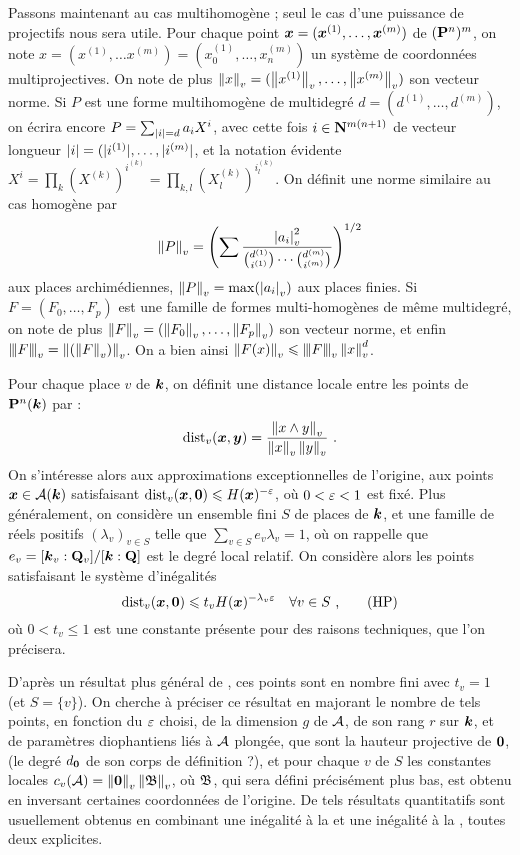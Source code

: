 Passons maintenant au cas multihomogène ; seul le cas d'une puissance de
projectifs nous sera utile. Pour chaque point ${\boldsymbol{x}} = ({\boldsymbol{x}}^{(1)}, \dots,
{\boldsymbol{x}}^{(m)})$ de $(\mathbf{P}^n)^m$, on note $x = (x^{(1)}, \dots x^{(m)}) =
(x_0^{(1)}, \dots, x_n^{(m)})$ un système de coordonnées multiprojectives. On
note de plus $\left\lVert x\right\rVert_{v} = (\left\lVert x^{(1)}\right\rVert_{v},\dots, \left\lVert x^{(m)}\right\rVert_{v})$ son vecteur norme.
Si $P$ est une forme multihomogène de multidegré $d= (d^{(1)}, \dots,
d^{(m)})$, on écrira encore $P = \sum_{{|i|}=d} a_i X^i$, avec cette fois $i
\in \mathbf{N}^{m(n+1)}$ de vecteur longueur ${|i|} = (|i^{(1)}|, \dots, |i^{(m)}|$,
et la notation évidente $X^i = \prod_{k} (X^{(k)})^{i^{(k)}} = \prod_{k, l}
(X_l^{(k)})^{i_l^{(k)}}$. On définit une norme similaire au cas homogène par
\[
  \left\lVert P\right\rVert_{v} = \left( \sum \frac{ \left\lvert a_i\right\rvert_{v}^2}{\binom{d^{(1)}}{i^{(1)}} \cdots
  \binom{d^{(m)}}{i^{(m)}} } \right)^{1/2}
\]
aux places archimédiennes, $\left\lVert P\right\rVert_{v} = \max(\left\lvert a_i\right\rvert_{v})$ aux places finies. Si
$F = (F_0, \dots, F_p)$ est une famille de formes multi-homogènes de même
multidegré, on note de plus $\left\lVert F\right\rVert_{v} = (\left\lVert F_0\right\rVert_{v}, \dots, \left\lVert F_p\right\rVert_{v})$ son vecteur
norme, et enfin $\left\lvert\hspace{-1pt} \left\lvert\hspace{-1pt} \left\lvert F\right\rvert \hspace{-1pt}\right\rvert \hspace{-1pt}\right\rvert_{v} = \left\lVert(\left\lVert F\right\rVert_{v})\right\rVert_{v}$. On a bien ainsi $\left\lVert F(x)\right\rVert_{v} \leqslant
\left\lvert\hspace{-1pt} \left\lvert\hspace{-1pt} \left\lvert F\right\rvert \hspace{-1pt}\right\rvert \hspace{-1pt}\right\rvert_{v}\left\lVert x\right\rVert_{v}^d$.

Pour chaque place $v$ de $\boldsymbol{k}$, on définit une distance locale entre les
points de $\mathbf{P}^n(\boldsymbol{k})$ par :
\[
  \mathrm{dist}_v({\boldsymbol{x}}, {\boldsymbol{y}}) = \frac{\left\lVert x\wedge y \right\rVert_{v}}{\left\lVert x\right\rVert_{v}\left\lVert y\right\rVert_{v}}\text{ .}
\]
On s'intéresse alors aux approximations exceptionnelles de l'origine,  aux points ${\boldsymbol{x}} \in \mathcal{A}(\boldsymbol{k})$ satisfaisant $\mathrm{dist}_v({\boldsymbol{x}}, {\boldsymbol{0}}) \leqslant
H({\boldsymbol{x}})^{-\varepsilon}$, où $0<\varepsilon<1$ est fixé.  Plus généralement, on considère un
ensemble fini $S$ de places de $\boldsymbol{k}$, et une famille de réels positifs
$(\lambda_v)_{v\in S}$ telle que $\sum_{v\in S} e_v \lambda_v = 1$, où on
rappelle que $e_v = [\boldsymbol{k}_v : \mathbf{Q}_v]/[\boldsymbol{k} : \mathbf{Q}]$ est le degré local relatif.
On considère alors les points satisfaisant le système d'inégalités
\[
  \mathrm{dist}_v({\boldsymbol{x}}, {\boldsymbol{0}}) \leqslant t_v H({\boldsymbol{x}})^{-\lambda_v \varepsilon} \quad
  \forall v \in S \text{ ,} \tag{HP} \label{hyp}
\]
où $0<t_v\le 1$ est une constante présente pour des raisons techniques, que
l'on précisera.

D'après un résultat plus général de , ces points sont en nombre
fini avec $t_v = 1$ (et $S= \{v\}$). On cherche à préciser ce résultat en
majorant le nombre de tels points, en fonction du $\varepsilon$ choisi, de la
dimension $g$ de $\mathcal{A}$, de son rang $r$ sur $\boldsymbol{k}$, et de paramètres
diophantiens liés à $\mathcal{A}$ plongée, que sont la hauteur projective de ${\boldsymbol{0}}$, (le
degré $d_{\boldsymbol{0}}$ de son corps de définition ?), et pour chaque $v$ de $S$ les
constantes locales $c_v(\mathcal{A}) = \left\lVert{\boldsymbol{0}}\right\rVert_{v}\left\lVert\mathfrak{B}\right\rVert_{v}$, où $\mathfrak{B}$, qui sera défini
précisément plus bas, est obtenu en inversant certaines coordonnées de
l'origine. De tels résultats quantitatifs sont usuellement obtenus en
combinant une inégalité à la  et une inégalité à la ,
toutes deux explicites.

